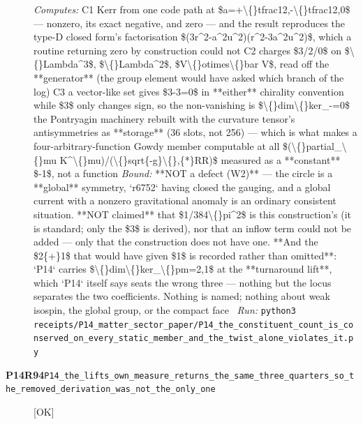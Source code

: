 \begin{description}
\emph{Computes:} C1 Kerr from one code path at \$a=+\textbackslash\{\}tfrac12,-\textbackslash\{\}tfrac12,0\$ --- nonzero, its exact negative, and zero --- and the result reproduces the type-D closed form's factorisation \$(3r\textasciicircum{}2-a\textasciicircum{}2u\textasciicircum{}2)(r\textasciicircum{}2-3a\textasciicircum{}2u\textasciicircum{}2)\$, which a routine returning zero by construction could not  C2 charges \$3/2/0\$ on \$\textbackslash\{\}Lambda\textasciicircum{}3\$, \$\textbackslash\{\}Lambda\textasciicircum{}2\$, \$V\textbackslash\{\}otimes\textbackslash\{\}bar V\$, read off the **generator** (the group element would have asked which branch of the log)  C3 a vector-like set gives \$3-3=0\$ in **either** chirality convention while \$3\$ only changes sign, so the non-vanishing is \$\textbackslash\{\}dim\textbackslash\{\}ker\_-=0\$  the Pontryagin machinery rebuilt with the curvature tensor's antisymmetries as **storage** (36 slots, not 256) --- which is what makes a four-arbitrary-function Gowdy member computable at all  \$(\textbackslash\{\}partial\_\textbackslash\{\}mu K\textasciicircum{}\textbackslash\{\}mu)/(\textbackslash\{\}sqrt\{-g\}\textbackslash\{\},\{*\}RR)\$ measured as a **constant** \$-1\$, not a function
 \emph{Bound:}  **NOT a defect (W2)** --- the circle is a **global** symmetry, `r6752` having closed the gauging, and a global current with a nonzero gravitational anomaly is an ordinary consistent situation. **NOT claimed** that \$1/384\textbackslash\{\}pi\textasciicircum{}2\$ is this construction's (it is standard; only the \$3\$ is derived), nor that an inflow term could not be added --- only that the construction does not have one.  **And the \$2\{+\}1\$ that would have given \$1\$ is recorded rather than omitted**: `P14` carries \$\textbackslash\{\}dim\textbackslash\{\}ker\_\textbackslash\{\}pm=2,1\$ at the **turnaround lift**, which `P14` itself says seats the wrong three --- nothing but the locus separates the two coefficients. Nothing is named; nothing about weak isospin, the global group, or the compact face
\ \emph{Run:} \texttt{python3 receipts/P14\_matter\_sector\_paper/P14\_the\_constituent\_count\_is\_conserved\_on\_every\_static\_member\_and\_the\_twist\_alone\_violates\_it.py}
\item[\rcptlabel{P14_the_lifts_own_measure_returns_the_same_three_quarters_so_the_removed_derivation_was_not_the_only_one}{P14R94}\textbf{P14R94}\quad\texttt{P14\_the\_lifts\_own\_measure\_returns\_the\_same\_three\_quarters\_so\_the\_removed\_derivation\_was\_not\_the\_only\_one}]\hfill\textsf{[OK]}\\

\end{description}
